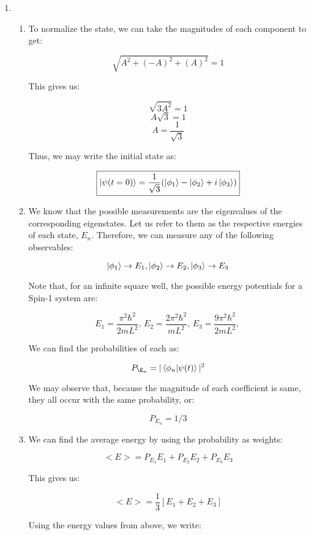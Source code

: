 \begin{enumerate}

  \item

    \begin{enumerate}

      \item To normalize the state, we can take the magnitudes of each component to get:

        $$\sqrt{A^2+(-A)^2+(A)^2}=1$$

        This gives us:

        $$\sqrt{3A^2}=1$$
        $$A\sqrt{3}=1$$
        $$\boxed{A=\frac{1}{\sqrt{3}}}$$

        Thus, we may write the initial state as:

        $$\boxed{\ket{\psi(t=0)}=\frac{1}{\sqrt{3}}(\ket{\phi_1}-\ket{\phi_2}+i\ket{\phi_3})}$$

      \item We know that the possible measurements are the eigenvalues of the corresponding eigenstates. Let us refer to them as the respective energies of each state, $E_n$. Therefore, we can measure any of the following observables:

        $$\ket{\phi_1}\to E_1,\ket{\phi_2}\to E_2,\ket{\phi_3}\to E_3$$

        Note that, for an infinite square well, the possible energy potentials for a Spin-1 system are:

        $$\boxed{E_1=\frac{\pi^2\hbar^2}{2mL^2},\,E_2=\frac{2\pi^2\hbar^2}{mL^2},\,E_3=\frac{9\pi^2\hbar^2}{2mL^2},\,}$$

        We can find the probabilities of each as:

        $$P_{\E_n}=|\bra{\phi_n}\ket{\psi(t)}|^2$$

        We may observe that, because the magnitude of each coefficient is same, they all occur with the same probability, or:

        $$\boxed{P_{E_n}=1/3}$$

      \item We can find the average energy by using the probability as weights:

        $$<E>=P_{E_1}E_1+P_{E_2}E_2+P_{E_3}E_3$$

        This gives us:

        $$<E>=\frac{1}{3}[E_1+E_2+E_3]$$

        Using the energy values from above, we write:


\end{enumerate}
\end{enumerate}
